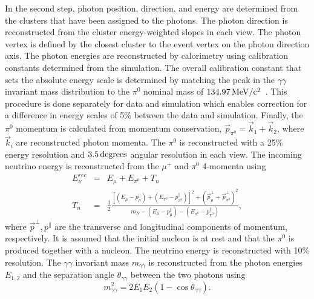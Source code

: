 In the second step, photon position, direction, and energy are determined from
the clusters that have been assigned to the photons. 
The photon direction is reconstructed from the cluster energy-weighted slopes in each view.
The photon vertex is defined by the closest cluster to the event
vertex on the photon direction axis. 
The photon energies are reconstructed by calorimetry using calibration constants 
determined from the simulation. 
The overall calibration constant that sets the absolute energy scale is
determined by matching the peak in the $\gamma\gamma$ invariant mass
distribution to the $\pi^0$ nominal mass of
$\unit[134.97]{MeV/c^2}$~\cite{pdg}. 
This procedure is done separately for data and simulation which enables
correction for a difference in energy scales of 5\% between the data and simulation. 
Finally, the $\pi^0$ momentum is calculated from momentum conservation, $\vec p_{\pi^0}
= \vec{k}_1 + \vec{k}_2$, where $\vec{k}_i$ %
are reconstructed photon momenta. 
The $\pi^0$ is reconstructed with a 25\% energy resolution and
$\unit[3.5]{degrees}$ angular resolution in each view. The incoming neutrino energy is
reconstructed from the $\mu^+$ and $\pi^0$ 4-momenta using
\begin{eqnarray}
 E_\nu^{rec} &=& E_\mu + E_{\pi^0} + T_n \\ \nonumber
 T_n &=& \frac{1}{2}\frac{[(E_\mu-p_\mu^\parallel)+(E_{\pi^0}-p_{\pi^0}^\parallel)]^2 + (\vec{p}_\mu^\perp + \vec{p}^\perp_{\pi^0})^2}
 {m_N-(E_\mu-p_\mu^\parallel)-(E_{\pi^0}-p_{\pi^0}^\parallel)},
\end{eqnarray}
where $\vec{p}^\perp, p^\parallel$ are the transverse and longitudinal components of momentum, respectively. 
It is assumed that the initial nucleon is at rest and that the $\pi^0$ is produced
together with a nucleon. The neutrino energy is reconstructed with 10\% resolution.
The $\gamma\gamma$ invariant mass $m_{\gamma\gamma}$ is reconstructed from the photon energies $E_{1,2}$ and
the separation angle $\theta_{\gamma\gamma}$ between the two photons using
\begin{equation}
m_{\gamma\gamma}^2=2E_1E_2(1-\cos\theta_{\gamma\gamma}). 
\end{equation}

